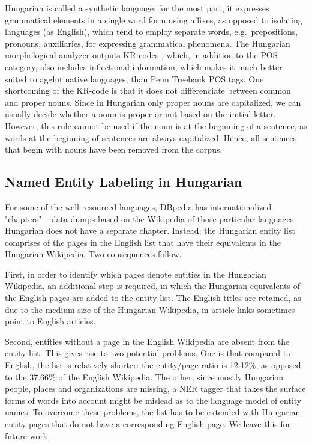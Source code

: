 \documentclass[11pt]{article}
\begin{document}

Hungarian is called a synthetic language: for the most part, it expresses grammatical elements in a single word form using affixes, as opposed to isolating languages (as English), which tend to employ separate words, e.g.~prepositions, pronouns, auxiliaries, for expressing grammatical phenomena. The Hungarian morphological analyzer outputs KR-codes \cite{Kornai:04}, which, in addition to the POS category, also includes inflectional information, which makes it much better suited to agglutinative languages, than Penn Treebank POS tags. One shortcoming of the KR-code is that it does not differenciate between common and proper nouns. Since in Hungarian only proper nouns are capitalized, we can usually decide whether a noun is proper or not based on the initial letter. However, this rule cannot be used if the noun is at the beginning of a sentence, as words at the beginning of sentences are always capitalized. Hence, all sentences that begin with nouns have been removed from the corpus.

\subsection{Named Entity Labeling in Hungarian}

For some of the well-resourced languages, DBpedia has internationalized "chapters" -- data dumps based on the Wikipedia of those particular languages. Hungarian does not have a separate chapter. Instead, the Hungarian entity list comprises of the pages in the English list that have their equivalents in the Hungarian Wikipedia. Two consequences follow.

First, in order to identify which pages denote entities in the Hungarian Wikipedia, an additional step is required, in which the Hungarian equivalents of the English pages are added to the entity list. The English titles are retained, as due to the medium size of the Hungarian Wikipedia, in-article links sometimes point to English articles.

Second, entities without a page in the English Wikipedia are absent from the entity list. This gives rise to two potential problems. One is that compared to English, the list is relatively shorter: the entity/page ratio is 12.12\%, as opposed to the 37.66\% of the English Wikipedia. The other, since mostly Hungarian people, places and organizations are missing, a NER tagger that takes the surface forms of words into account might be mislead as to the language model of entity names. To overcome these problems, the list has to be extended with Hungarian entity pages that do not have a corresponding English page. We leave this for future work.
\end{document}
